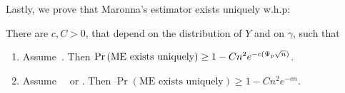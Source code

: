 \documentclass[times,sort&compress,3p]{elsarticle}
\begin{document}
Lastly, we prove that Maronna's estimator exists uniquely w.h.p:
\begin{lemma}
        \label{lem:maronna-unique}
        There are $c,C>0$, that depend on the distribution of $Y$ and on $\gamma$, such that 
        \begin{enumerate}
                \item Assume~\AssumLC. Then
               $\Pr\left(\textrm{ME exists uniquely}\right) \ge 1- Cn^2e^{-c(\Psi_p\sqrt{n})}$.
                \item Assume~\AssumIndep~ or \AssumCCPSB. Then
                $\Pr\left(\textrm{ME exists uniquely}\right) \ge 1- Cn^2e^{-cn}$.
        \end{enumerate}
\end{lemma}  
\end{document}
